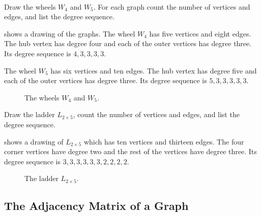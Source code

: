 \begin{exam}
\label{exam_wheel_ladder}
~
    \begin{apart}
        \item Draw the wheels $W_4$ and $W_5$.  For each graph count the number of vertices and edges, and list the degree sequence.
            \begin{soln}
                 shows a drawing of the graphs.  The wheel $W_4$ has five vertices and eight edges.  The hub vertex has degree four and each of the outer vertices has degree three. Its degree sequence is $4,3,3,3,3$.

                The wheel $W_5$ has six vertices and ten edges.  The hub vertex has degree five and each of the outer vertices has degree three. Its degree sequence is $5,3,3,3,3,3$.
            \end{soln}
                
            \begin{figure}[hbtp]
                \centering
                
                \caption{The wheels $W_4$ and $W_5$.}
                \label{fig_W4W5}
            \end{figure}

        \item Draw the ladder $L_{2\times5}$, count the number of vertices and edges, and list the degree sequence.
            \begin{soln}
                 shows a drawing of $L_{2\times 5}$ which has ten vertices and thirteen edges.  The four corner vertices have degree two and the rest of the vertices have degree three. Its degree sequence is $3,3,3,3,3,3,2,2,2,2$.
            \end{soln}
                
            \begin{figure}[hbtp]
                \centering
                
                \caption{The ladder $L_{2\times 5}$.}
                    \label{fig_L2x5}
            \end{figure}
    \end{apart}
\end{exam}

\newcommand{\subadjmat}{The Adjacency Matrix of a Graph}
\subsection{\subadjmat}
\label{sub_adj_matrix}

